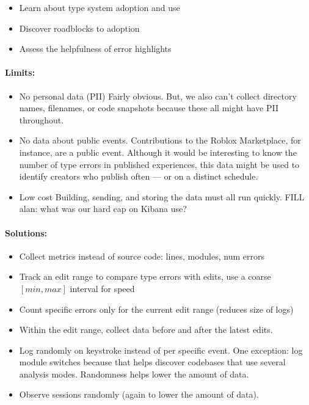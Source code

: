 \documentclass[english,submission,cleveref]{programming}
\begin{document}
\begin{itemize}
  \item
    Learn about type system adoption and use
  \item
    Discover roadblocks to adoption
  \item
    Assess the helpfulness of error highlights
\end{itemize}

\paragraph{Limits:}

\begin{itemize}
\item
  No personal data (PII)
  \subitem
    Fairly obvious.
    But, we also can't collect directory names, filenames, or code snapshots
    because these all might have PII throughout.
\item
  No data about public events.
  \subitem
    Contributions to the Roblox Marketplace, for instance, are a public event.
    Although it would be interesting to know the number of type errors
    in published experiences, this data might be used to identify creators
    who publish often --- or on a distinct schedule.
\item
  Low cost
  \subitem
    Building, sending, and storing the data must all run quickly.
    FILL alan: what was our hard cap on Kibana use?
\end{itemize}


\paragraph{Solutions:}

\begin{itemize}
  \item
    Collect metrics instead of source code: lines, modules, num errors
  \item
    Track an edit range to compare type errors with edits,
    use a coarse $[min, max]$ interval for speed
  \item
    Count specific errors only for the current edit range
    (reduces size of logs)
  \item
    Within the edit range, collect data before and after the latest edits.
  \item
    Log randomly on keystroke instead of per specific event.
    One exception: log module switches because that helps discover
    codebases that use several analysis modes.
    Randomness helps lower the amount of data.
  \item
    Observe sessions randomly (again to lower the amount of data).
\end{itemize}
\end{document}

